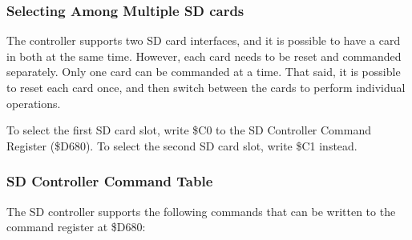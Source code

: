 \subsubsection{Selecting Among Multiple SD cards}

The controller supports two SD card interfaces, and it is possible to
have a card in both at the same time.  However, each card needs to be
reset and commanded separately.  Only one card can be commanded at a
time.  That said, it is possible to reset each card once, and then
switch between the cards to perform individual operations.

To select the first SD card slot, write \$C0 to the SD Controller
Command Register (\$D680).  To select the second SD card slot, write
\$C1 instead.

\subsubsection{SD Controller Command Table}

The SD controller supports the following commands that can be written
to the command register at \$D680:


